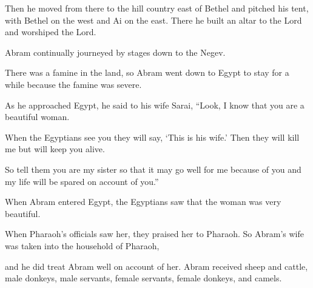 \begin{scripture}
 Then he moved from there to the hill country east of Bethel and pitched his tent, with Bethel on the west and Ai on the east. There he built an altar to the Lord and worshiped the Lord.
 Abram continually journeyed by stages down to the Negev.
\everypar{}

 There was a famine in the land, so Abram went down to Egypt to stay for a while because the famine was severe.
 As he approached Egypt, he said to his wife Sarai, ``Look, I know that you are a beautiful woman.
 When the Egyptians see you they will say, `This is his wife.' Then they will kill me but will keep you alive.
 So tell them you are my sister so that it may go well for me because of you and my life will be spared on account of you.''
\everypar{}

 When Abram entered Egypt, the Egyptians saw that the woman was very beautiful.
 When Pharaoh's officials saw her, they praised her to Pharaoh. So Abram's wife was taken into the household of Pharaoh,
 and he did treat Abram well on account of her. Abram received sheep and cattle, male donkeys, male servants, female servants, female donkeys, and camels.
\everypar{}


\end{scripture}

